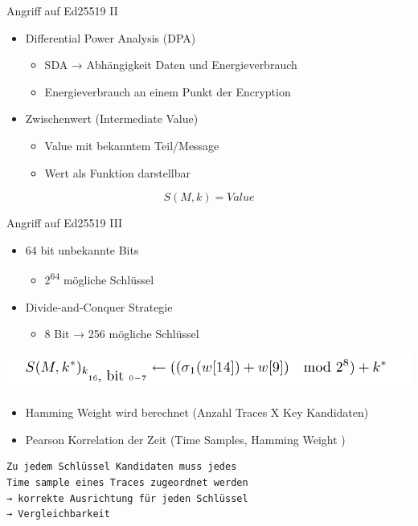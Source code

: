 \documentclass[
  10pt,
  ignorenonframetext,
  aspectratio=169,
]{beamer}
\providecommand{\tightlist}{%
  \setlength{\itemsep}{0pt}\setlength{\parskip}{0pt}}
\begin{document}
\begin{frame}{Angriff auf Ed25519 II}
\protect\hypertarget{angriff-auf-ed25519-ii}{}
\begin{itemize}
\tightlist
\item
  Differential Power Analysis (DPA)

  \begin{itemize}
  \tightlist
  \item
    SDA → Abhängigkeit Daten und Energieverbrauch
  \item
    Energieverbrauch an einem Punkt der Encryption
  \end{itemize}
\item
  Zwischenwert (Intermediate Value)

  \begin{itemize}
  \tightlist
  \item
    Value mit bekanntem Teil/Message
  \item
    Wert als Funktion darstellbar
  \end{itemize}
\end{itemize}

\[ S(M,k) = Value \]
\end{frame}

\begin{frame}[fragile]{Angriff auf Ed25519 III}
\protect\hypertarget{angriff-auf-ed25519-iii}{}
\begin{itemize}
\tightlist
\item
  64 bit unbekannte Bits

  \begin{itemize}
  \tightlist
  \item
    2\textsuperscript{64} mögliche Schlüssel
  \end{itemize}
\item
  Divide-and-Conquer Strategie

  \begin{itemize}
  \tightlist
  \item
    8 Bit → 256 mögliche Schlüssel
  \end{itemize}
\end{itemize}

\includegraphics[width=\textwidth,height=0.6\textheight]{Abbildungen/keyDPA.png}

\begin{itemize}
\tightlist
\item
  Hamming Weight wird berechnet (Anzahl Traces X Key Kandidaten)
\item
  Pearson Korrelation der Zeit (Time Samples, Hamming Weight )
\end{itemize}

\begin{verbatim}
Zu jedem Schlüssel Kandidaten muss jedes    
Time sample eines Traces zugeordnet werden    
→ korrekte Ausrichtung für jeden Schlüssel  
→ Vergleichbarkeit
\end{verbatim}
\end{frame}
\end{document}
